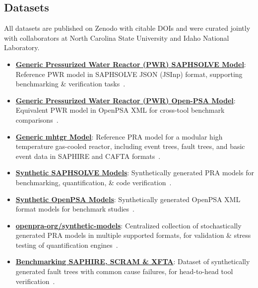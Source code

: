 \subsection{Datasets}
All datasets are published on Zenodo with citable DOIs and were curated jointly with collaborators at North Carolina State University and Idaho National Laboratory.
\begin{itemize}
    \item \textbf{\href{https://doi.org/10.5281/zenodo.13996959}{Generic Pressurized Water Reactor (PWR) SAPHSOLVE Model}}: Reference PWR model in SAPHSOLVE JSON (JSInp) format, supporting benchmarking \& verification tasks~\cite{aras_generic_2024}.
   
    \item \textbf{\href{https://doi.org/10.5281/zenodo.14070453}{Generic Pressurized Water Reactor (PWR) Open-PSA Model}}: Equivalent PWR model in OpenPSA XML for cross-tool benchmark comparisons~\cite{aras_generic_2024-1}.

    \item \textbf{\href{https://zenodo.org/doi/10.5281/zenodo.15397904}{Generic \acrfull{mhtgr} Model}}: Reference PRA model for a modular high temperature gas-cooled reactor, including event trees, fault trees, and basic event data in SAPHIRE and CAFTA formats~\cite{hamza_openpra-orggeneric-mhtgr-model_2025}.

    \item \textbf{\href{https://doi.org/10.5281/zenodo.13996735}{Synthetic SAPHSOLVE Models}}: Synthetically generated PRA models for benchmarking, quantification, \& code verification~\cite{aras_synthetic_2024}.
    
    \item \textbf{\href{https://doi.org/10.5281/zenodo.13996370}{Synthetic OpenPSA Models}}: Synthetically generated OpenPSA XML format models for benchmark studies~\cite{aras_synthetic_2024-1}.
    
    \item \textbf{\href{https://doi.org/10.5281/zenodo.15320670}{openpra-org/synthetic-models}}: Centralized collection of stochastically generated PRA models in multiple supported formats, for validation \& stress testing of quantification engines~\cite{aras_synthetic_2025}.
    
    \item \textbf{\href{https://doi.org/10.5281/zenodo.7706615}{Benchmarking SAPHIRE, SCRAM \& XFTA}}: Dataset of synthetically generated fault trees with common cause failures, for head-to-head tool verification~\cite{earthperson_dataset_2023}.
    

\end{itemize}

